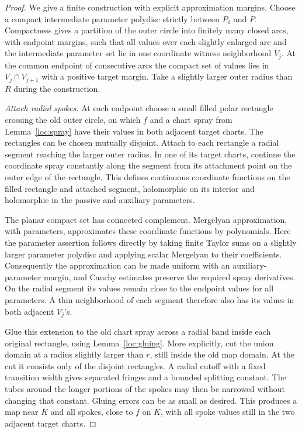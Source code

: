 \begin{proof}
We give a finite construction with explicit approximation margins.
Choose a compact intermediate parameter polydisc strictly between
$P_0$ and $P$. Compactness gives a partition of the outer circle
into finitely many closed arcs, with endpoint margins, such that
all values over each slightly enlarged arc and the intermediate
parameter set lie in one coordinate witness neighborhood $V_j$.
At the common endpoint of consecutive arcs the compact set of
values lies in $V_j\cap V_{j+1}$ with a positive target margin.
Take a slightly larger outer radius than $R$ during the construction.

\emph{Attach radial spokes.}
At each endpoint choose a small filled polar rectangle crossing
the old outer circle, on which $f$ and a chart spray from
Lemma~\ref{loc:spray} have their values in both adjacent target
charts. The rectangles can be chosen mutually disjoint. Attach
to each rectangle a radial segment reaching the larger outer
radius. In one of its target charts, continue the coordinate
spray constantly along the segment from its attachment point on
the outer edge of the rectangle. This defines continuous
coordinate functions on the filled rectangle and attached segment,
holomorphic on its interior and holomorphic in the passive and
auxiliary parameters.

The planar compact set has connected complement. Mergelyan
approximation, with parameters, approximates these coordinate
functions by polynomials. Here the parameter assertion follows
directly by taking finite Taylor sums on a slightly larger
parameter polydisc and applying scalar Mergelyan to their
coefficients. Consequently the approximation can be made uniform
with an auxiliary-parameter margin, and Cauchy estimates preserve
the required spray derivatives. On the radial segment its values
remain close to the endpoint values for all parameters. A thin
neighborhood of each segment therefore also has its values in
both adjacent $V_j$'s.

Glue this extension to the old chart spray across a radial band
inside each original rectangle, using Lemma~\ref{loc:gluing}.
More explicitly, cut the union domain at a radius slightly larger
than $r$, still inside the old map domain. At the cut it consists
only of the disjoint rectangles. A radial cutoff with a fixed
transition width gives separated fringes and a bounded splitting
constant. The tubes around the longer portions of the spokes may
then be narrowed without changing that constant. Gluing errors
can be as small as desired. This produces a map near $K$ and all
spokes, close to $f$ on $K$, with all spoke values still in the
two adjacent target charts.


\end{proof}
